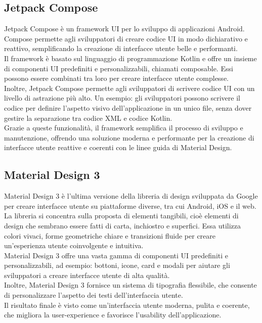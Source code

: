 \documentclass[a4paper,final,12pt]{report}
\begin{document}
 \subsection{Jetpack Compose}
 Jetpack Compose è un framework UI per lo sviluppo di applicazioni Android. Compose permette agli sviluppatori di creare codice UI in modo dichiarativo e reattivo, semplificando la creazione di interfacce utente belle e performanti.\\
Il framework è basato sul linguaggio di programmazione Kotlin e offre un insieme di componenti UI predefiniti e personalizzabili, chiamati composable. Essi possono essere combinati tra loro per creare interfacce utente complesse.\\
Inoltre, Jetpack Compose permette agli sviluppatori di scrivere codice UI con un livello di astrazione più alto. Un esempio: gli sviluppatori possono scrivere il codice per definire l'aspetto visivo dell'applicazione in un unico file, senza dover gestire la separazione tra codice XML e codice Kotlin.\\
Grazie a queste funzionalità, il framework semplifica il processo di sviluppo e manutenzione, offrendo una soluzione moderna e performante per la creazione di interfacce utente reattive e coerenti con le linee guida di Material Design.

 \subsection{Material Design 3}
Material Design 3 è l'ultima versione della libreria di design sviluppata da Google per creare interfacce utente su piattaforme diverse, tra cui Android, iOS e il web.\\
La libreria si concentra sulla proposta di elementi tangibili, cioè elementi di design che sembrano essere fatti di carta, inchiostro e superfici. Essa utilizza colori vivaci, forme geometriche chiare e transizioni fluide per creare un'esperienza utente coinvolgente e intuitiva.\\
Material Design 3 offre una vasta gamma di componenti UI predefiniti e personalizzabili, ad esempio: bottoni, icone, card e modali per aiutare gli sviluppatori a creare interfacce utente di alta qualità.\\
Inoltre, Material Design 3 fornisce un sistema di tipografia flessibile, che consente di personalizzare l'aspetto dei testi dell'interfaccia utente.\\
Il risultato finale è visto come un'interfaccia utente moderna, pulita e coerente, che migliora la user-experience e favorisce l'usability dell'applicazione.
\end{document}
